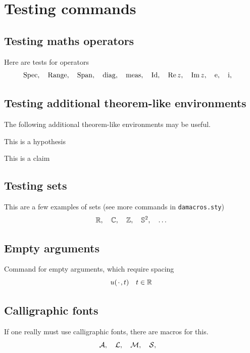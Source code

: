 \documentclass[a4paper]{siamart190516}
\begin{document}
\section{Testing commands}

\subsection{Testing maths operators}
Here are tests for operators
\[
  \operatorname{Spec}, \quad 
  \operatorname{Range}, \quad 
  \operatorname{Span}, \quad
  \operatorname{diag}, \quad
  \operatorname{meas}, \quad
  \operatorname{Id}, \quad
  \operatorname{Re} z, \quad
  \operatorname{Im} z, \quad
  \operatorname{e}, \quad
  \operatorname{i}, \quad
\]

\subsection{Testing additional theorem-like environments} The following additional
theorem-like environments may be useful.

\begin{hypothesis} \label{hyp:trivial}
  This is a hypothesis
\end{hypothesis}

\begin{claim} \label{clm:trivial}
  This is a claim
\end{claim}

\subsection{Testing sets}
This are a few examples of sets (see more commands in \texttt{damacros.sty})
\[
  \mathbb{R}, \quad
  \mathbb{C}, \quad
  \mathbb{Z}, \quad
  \mathbb{S}^2, \quad
  \ldots
\]

\subsection{Empty arguments}
Command for empty arguments, which require spacing
\[
  u({\mkern 2mu\cdot\mkern 2mu},t) \quad t \in \mathbb{R}
\]

\subsection{Calligraphic fonts}
If one really must use calligraphic fonts, there are macros for this.
\[
  \mathcal{A}, \quad
  \mathcal{L}, \quad
  \mathcal{M}, \quad
  \mathcal{S}, \quad
\]




\end{document}
